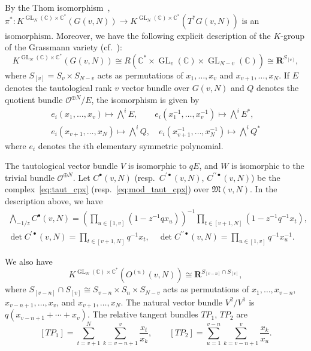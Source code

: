 \documentclass[12pt]{amsart}
\def\Bbb{\mathbb}
\def\frak{\mathfrak}
\theoremstyle{definition}
\theoremstyle{remark}
\numberwithin{equation}{subsection}
\newcommand{\C}{{\Bbb C}}
\newcommand{\Z}{{\Bbb Z}}
\newcommand{\GL}{\operatorname{GL}}
\newcommand{\M}{{\frak M}} %
\newcommand{\shfO}{\mathcal O}
\newcommand{\Wedge}{{\textstyle \bigwedge}}
\begin{document}
By the Thom isomorphism~\cite[5.4.17]{Gi-book}, $\pi^*\colon
K^{\GL_N(\C)\times\C^*}(G(v,N))\to K^{\GL_N(\C)\times\C^*}(T^*G(v,N))$
is an isomorphism. Moreover, we have the following explicit
description of the $K$-group of the Grassmann variety (cf.\ 
\cite[6.1.6]{Gi-book}):
\begin{equation*}
   K^{\GL_N(\C)\times\C^*}(G(v,N)) \cong
   R(\C^*\times \GL_v(\C)\times \GL_{N-v}(\C)) \cong
   \mathbf R^{S_{[v]}},
\end{equation*}
where $S_{[v]} = S_v\times S_{N-v}$ acts as permutations of
$x_1,\dots, x_v$ and $x_{v+1},\dots, x_N$. If $E$ denotes the
tautological rank $v$ vector bundle over $G(v,N)$ and $Q$ denotes
the quotient bundle $\shfO^{\oplus N}/E$, the isomorphism is given by
\begin{gather*}
  e_i(x_1,\dots, x_v) \mapsto \Wedge^i E, \qquad
  e_i(x_1^{-1},\dots, x_v^{-1}) \mapsto \Wedge^i E^*, \\
  e_i(x_{v+1},\dots, x_N) \mapsto \Wedge^i Q, \quad
  e_i(x_{v+1}^{-1},\dots, x_N^{-1}) \mapsto \Wedge^i Q^*
\end{gather*}
where $e_i$ denotes the $i$th elementary symmetric polynomial.

The tautological vector bundle $V$ is isomorphic to $q E$, and
$W$ is isomorphic to the trivial bundle $\shfO^{\oplus N}$.
Let $C^\bullet(v,N)$ 
(resp.\ $C^{\prime\bullet}(v,N)$, $C^{\prime\prime\bullet}(v,N)$)
be the complex~\eqref{eq:taut_cpx} 
(resp.\ \eqref{eq:mod_taut_cpx}) over $\M(v,N)$.
In the description above, we have
\begin{equation}\label{eq:genP}
\begin{gathered}
  \Wedge_{-1/z} C^\bullet(v,N) =
  \left( \prod_{u\in [1,v]}(1 - z^{-1} q x_u) \right)^{-1}
  \prod_{t\in [v+1,N]} (1 - z^{-1} q^{-1} x_t), \\
  \det C^{\prime\bullet}(v,N) = \prod_{t\in [v+1,N]} q^{-1} x_t,
  \quad
  \det C^{\prime\prime\bullet}(v,N) = \prod_{u\in [1,v]} q^{-1} x_u^{-1}.
\end{gathered}
\end{equation}

We also have
\begin{equation*}
   K^{\GL_N(\C)\times\C^*}(O^{(n)}(v,N)) \cong
   \mathbf R^{S_{[v-n]}\cap S_{[v]}},
\end{equation*}
where $S_{[v-n]}\cap S_{[v]} \cong S_{v-n}\times S_n\times S_{N-v}$
acts as permutations of $x_1,\dots, x_{v-n}$, $x_{v-n+1},\dots, x_v$,
and $x_{v+1},\dots, x_N$.
%
The natural vector bundle $V^2/V^1$ is $q (x_{v-n+1} + \cdots +
x_{v})$.
%
The relative tangent bundles $TP_1$, $TP_2$ are
\begin{equation*}
    [TP_1] = \sum_{t=v+1}^N \sum_{k=v-n+1}^v \frac{x_t}{x_k}, \qquad
    [TP_2] = \sum_{u=1}^{v-n} \sum_{k=v-n+1}^v \frac{x_k}{x_u}.
\end{equation*}
\end{document}
